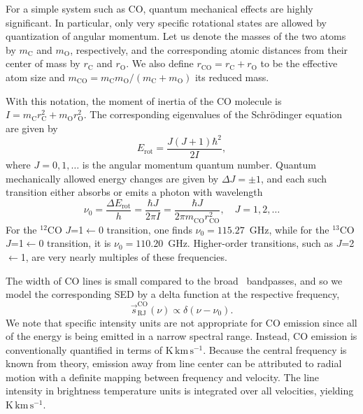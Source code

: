 \documentclass[onecolumn]{aa}
\newcommand{\s}[0]{\vec{s}}
\begin{document}
For a simple system such as CO, quantum mechanical effects are highly
significant. In particular, only very specific rotational states are
allowed by quantization of angular momentum. Let us denote the masses
of the two atoms by $m_{\mathrm{C}}$ and $m_{\mathrm{O}}$,
respectively, and the corresponding atomic distances from their center
of mass by $r_{\mathrm{C}}$ and $r_{\mathrm{O}}$. We also define
$r_{\mathrm{CO}}=r_{\mathrm{C}}+r_{\mathrm{O}}$ to be the effective
atom size and $m_{\mathrm{CO}} =
m_{\mathrm{C}}m_{\mathrm{O}}/(m_{\mathrm{C}}+m_{\mathrm{O}})$ its
reduced mass.

With this notation, the moment of inertia of the CO molecule is $I =
m_{\mathrm{C}}^{\phantom 2}r_{\mathrm{C}}^2 + m_{\mathrm{O}}^{\phantom 2}r_{\mathrm{O}}^2$. The
corresponding eigenvalues of the Schr\"odinger equation are given by
\begin{equation}
  E_{\mathrm{rot}} = \frac{J(J+1)\hbar^2}{2I},
\end{equation}
where $J=0,1,\ldots$ is the angular momentum quantum number. Quantum
mechanically allowed energy changes are given by $\Delta J=\pm1$, and
each such transition either absorbs or emits a photon with wavelength
\begin{equation}
  \nu_0 = \frac{\Delta E_{\mathrm{rot}}}{h} = \frac{\hbar J}{2\pi I}
	= \frac{\hbar J}{2\pi m_\mathrm{CO}^{\phantom{2}} r_{\mathrm{CO}}^2}, \quad J = 1, 2, \ldots
\end{equation}
For the $^{12}\mathrm{CO}$ $J$=1$\leftarrow$0 transition, one finds
$\nu_0=115.27$~GHz, while for the $^{13}\mathrm{CO}$ $J$=1$\leftarrow$0
transition, it is $\nu_0=110.20$~GHz. Higher-order transitions, such
as $J$=2$\leftarrow$1, are very
nearly multiples of these frequencies.

The width of CO lines is small compared to the broad \Planck\ bandpasses, 
and so we model the corresponding SED by a delta function at the
respective frequency,
\begin{equation}
\s^{\mathrm{CO}}_{\mathrm{RJ}}(\nu) \propto
\delta(\nu-\nu_0).
\label{eq:CO}
\end{equation}
We note that specific intensity units are not appropriate for
CO emission since all of the energy is being emitted in a narrow
spectral range. Instead, CO
emission is conventionally quantified in terms of
$\mathrm{K}\,\mathrm{km}\,\mathrm{s}^{-1}$. Because the central frequency
is known from theory, emission away from line center can be attributed
to radial motion with a definite mapping between frequency and velocity.
The line intensity in brightness temperature units is integrated over
all velocities, yielding $\mathrm{K}\,\mathrm{km}\,\mathrm{s}^{-1}$.
\end{document}
